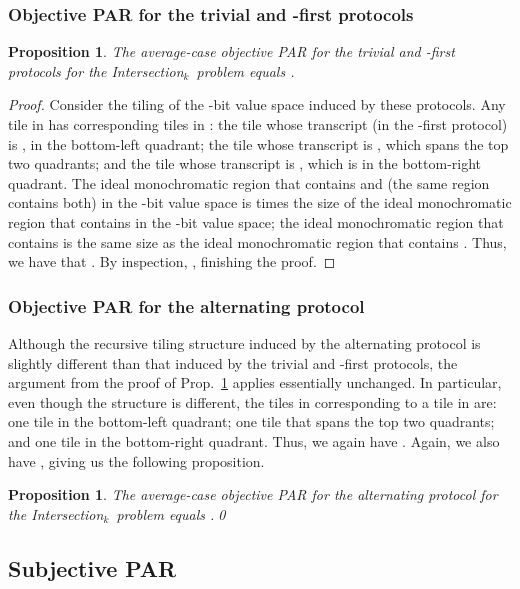 \documentclass{article}
\theoremstyle{theorem}
\newtheorem{prop}[theorem]{Proposition}
\theoremstyle{definition}
\theoremstyle{remark}
\newcommand{\intersection}{{\sc In\-ter\-sec\-tion}\ensuremath{_k}}
\begin{document}
\subsubsection{Objective PAR for the trivial and -first protocols}


\begin{prop}\label{prop:int-ob-triv}
The average-case objective PAR for the trivial and -first protocols for the \intersection\ problem equals .
\end{prop}
\begin{proof}
Consider the tiling  of the -bit value space induced by these protocols.  Any tile  in  has  corresponding tiles in : the tile whose transcript (in the -first protocol) is , in the bottom-left quadrant; the tile whose transcript is , which spans the top two quadrants; and the tile whose transcript is , which is in the bottom-right quadrant.  The ideal monochromatic region that contains  and  (the same region contains both) in the -bit value space is  times the size of the ideal monochromatic region that contains  in the -bit value space; the ideal monochromatic region that contains  is the same size as the ideal monochromatic region that contains .  Thus, we have that .  By inspection, , finishing the proof.
\end{proof}

\subsubsection{Objective PAR for the alternating protocol}

Although the recursive tiling structure induced by the alternating protocol is slightly different than that induced by the trivial and -first protocols, the argument from the proof of Prop.~\ref{prop:int-ob-triv} applies essentially unchanged.  In particular, even though the structure is different, the tiles in  corresponding to a tile  in  are: one tile in the bottom-left quadrant; one tile that spans the top two quadrants; and one tile in the bottom-right quadrant.  Thus, we again have .  Again, we also have , giving us the following proposition.
\begin{prop}\label{prop:int-ob-alt}
The average-case objective PAR for the alternating protocol for the \intersection\ problem equals .\hfil \qed
\end{prop}


\subsection{Subjective PAR}
\end{document}
